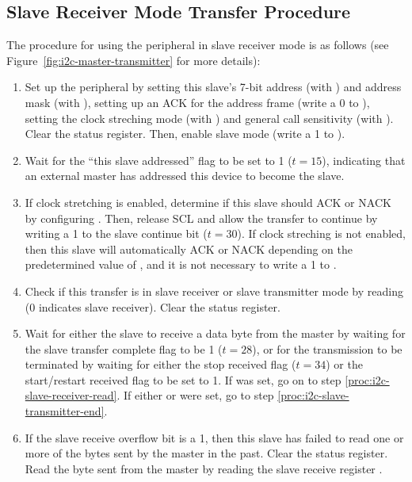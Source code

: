 


\subsection{Slave Receiver Mode Transfer Procedure}

The procedure for using the  peripheral in slave receiver mode is as follows (see Figure~\ref{fig:i2c-master-transmitter} for more details):

\begin{enumerate}
	\item Set up the  peripheral by setting this slave's 7-bit address (with ) and address mask (with ), setting up an ACK for the address frame (write a 0 to ), setting the clock streching mode (with ) and general call sensitivity (with ). Clear the status register. Then, enable slave mode (write a 1 to ).
	\item Wait for the ``this slave addressed'' flag  to be set to 1 ($t = 15$), indicating that an external master has addressed this device to become the slave.
	\item If clock stretching is enabled, determine if this slave should ACK or NACK by configuring . Then, release SCL and allow the transfer to continue by writing a 1 to the slave continue bit  ($t = 30$). If clock streching is not enabled, then this slave will automatically ACK or NACK depending on the predetermined value of , and it is not necessary to write a 1 to .
	\item Check if this transfer is in slave receiver or slave transmitter mode by reading  (0 indicates slave receiver). Clear the status register.
	\item \label{proc:i2c-slave-receiver-wait} Wait for either the slave to receive a data byte from the master by waiting for the slave transfer complete flag  to be 1 ($t = 28$), or for the transmission to be terminated by waiting for either the stop received flag  ($t = 34$) or the start/restart received flag  to be set to 1. If  was set, go on to step \ref{proc:i2c-slave-receiver-read}. If either  or  were set, go to step \ref{proc:i2c-slave-transmitter-end}.
	\item \label{proc:i2c-slave-receiver-read} If the slave receive overflow bit  is a 1, then this slave has failed to read one or more of the bytes sent by the master in the past. Clear the status register. Read the byte sent from the master by reading the slave receive register .

\end{enumerate}
